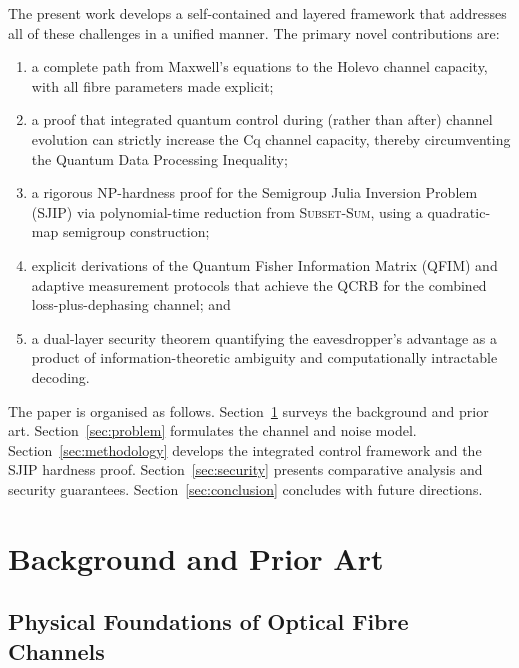 \documentclass[journal,twocolumn]{IEEEtran}
\theoremstyle{definition}
\theoremstyle{plain}
\begin{document}
The present work develops a self-contained and layered framework
that addresses all of these challenges in a unified manner.
The primary novel contributions are:
\begin{enumerate}[leftmargin=*, label=(\roman*), itemsep=2pt]
  \item a complete path from Maxwell's equations to the Holevo
        channel capacity, with all fibre parameters made explicit;
  \item a proof that integrated quantum control during (rather than
        after) channel evolution can strictly increase the Cq
        channel capacity, thereby circumventing the Quantum Data
        Processing Inequality;
  \item a rigorous NP-hardness proof for the Semigroup Julia
        Inversion Problem (SJIP) via polynomial-time reduction from
        \textsc{Subset-Sum}, using a quadratic-map semigroup
        construction;
  \item explicit derivations of the Quantum Fisher Information
        Matrix (QFIM) and adaptive measurement protocols that
        achieve the QCRB for the combined loss-plus-dephasing
        channel; and
  \item a dual-layer security theorem quantifying the eavesdropper's
        advantage as a product of information-theoretic ambiguity
        and computationally intractable decoding.
\end{enumerate}

The paper is organised as follows.  Section~\ref{sec:background}
surveys the background and prior art.  Section~\ref{sec:problem}
formulates the channel and noise model.
Section~\ref{sec:methodology} develops the integrated control
framework and the SJIP hardness proof.
Section~\ref{sec:security} presents comparative analysis and
security guarantees.  Section~\ref{sec:conclusion} concludes with
future directions.

\section{Background and Prior Art}
\label{sec:background}

\subsection{Physical Foundations of Optical Fibre Channels}
\end{document}
